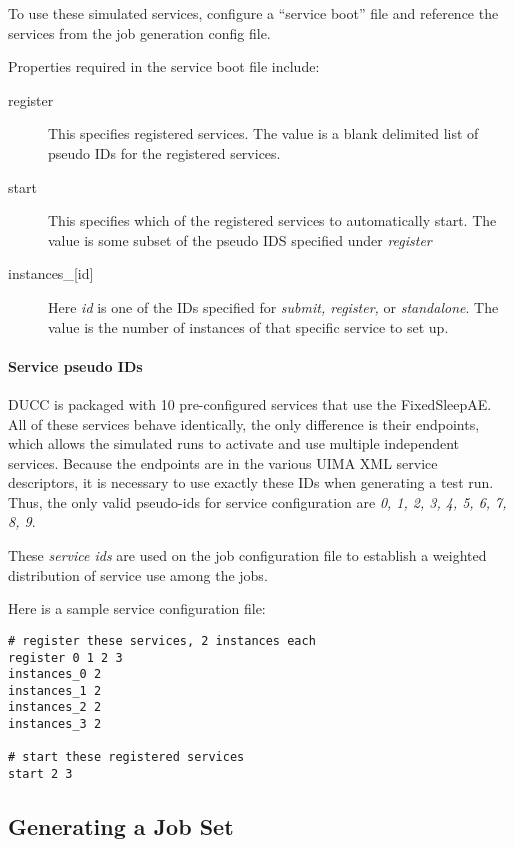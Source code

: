      To use these simulated services, configure a ``service boot'' file and reference
     the services from the job generation config file.

     Properties required in the service boot file include:
     \begin{description}
       \item[register] This specifies registered services.  The value is a blank delimited
         list of pseudo IDs for the registered services.
       \item[start] This specifies which of the registered services to automatically 
         start.  The value is some subset of the pseudo IDS specified under {\em register}
       \item[instances\_{[id]}] Here {\em id} is one of the IDs specified for {\em submit,
           register,} or {\em standalone}.  The value is the number of instances of that
         specific service to set up.
     \end{description}
     
     \paragraph{Service pseudo IDs}
     DUCC is packaged with 10 pre-configured services that use the FixedSleepAE. All of these
     services behave identically, the only difference is their endpoints, which allows
     the simulated runs to activate and use multiple independent services.  Because the
     endpoints are in the various UIMA XML service descriptors, it is necessary to use
     exactly these IDs when generating a test run.  Thus, the only valid pseudo-ids
     for service configuration are {\em 0, 1, 2, 3, 4, 5, 6, 7, 8, 9}.

     These {\em service ids} are used on the job configuration file to establish a
     weighted distribution of service use among the jobs.

     Here is a sample service configuration file:
\begin{verbatim}
# register these services, 2 instances each
register 0 1 2 3
instances_0 2
instances_1 2
instances_2 2
instances_3 2

# start these registered services
start 2 3 
\end{verbatim}

     \subsection{Generating a Job Set}

